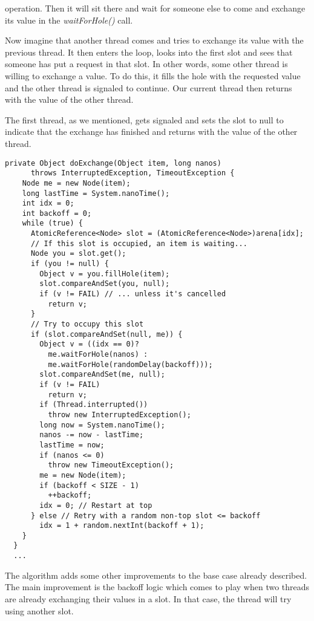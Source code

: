 operation. Then it will sit there and wait for someone else to come and exchange
its value in the \textit{waitForHole()} call.
\par
Now imagine that another thread comes and tries to exchange its value with the
previous thread. It then enters the loop, looks into the first slot and sees
that someone has put a request in that slot. In other words, some other thread
is willing to exchange a value. To do this, it fills the hole with the requested
value and the other thread is signaled to continue. Our current thread then
returns with the value of the other thread.
\par
The first thread, as we mentioned, gets signaled and sets the slot to null to
indicate that the exchange has finished and returns with the value of the other
thread. 
\par
\hfill
\begin{lstlisting}[style=numbers]
  private Object doExchange(Object item, long nanos)
      throws InterruptedException, TimeoutException {
    Node me = new Node(item);
    long lastTime = System.nanoTime();
    int idx = 0;
    int backoff = 0;
    while (true) {
      AtomicReference<Node> slot = (AtomicReference<Node>)arena[idx];
      // If this slot is occupied, an item is waiting...
      Node you = slot.get();
      if (you != null) {
        Object v = you.fillHole(item);
        slot.compareAndSet(you, null);
        if (v != FAIL) // ... unless it's cancelled
          return v;
      }
      // Try to occupy this slot
      if (slot.compareAndSet(null, me)) {
        Object v = ((idx == 0)?
          me.waitForHole(nanos) :
          me.waitForHole(randomDelay(backoff)));
        slot.compareAndSet(me, null);
        if (v != FAIL)
          return v;
        if (Thread.interrupted())
          throw new InterruptedException();
        long now = System.nanoTime();
        nanos -= now - lastTime;
        lastTime = now;
        if (nanos <= 0)
          throw new TimeoutException();
        me = new Node(item);
        if (backoff < SIZE - 1)
          ++backoff;
        idx = 0; // Restart at top
      } else // Retry with a random non-top slot <= backoff
        idx = 1 + random.nextInt(backoff + 1);
    }
  }
  ...
\end{lstlisting}
\hfill
\par
The algorithm adds some other improvements to the base case already described.
The main improvement is the backoff logic which comes to play when two threads
are already exchanging their values in a slot. In that case, the thread will try
using another slot.
